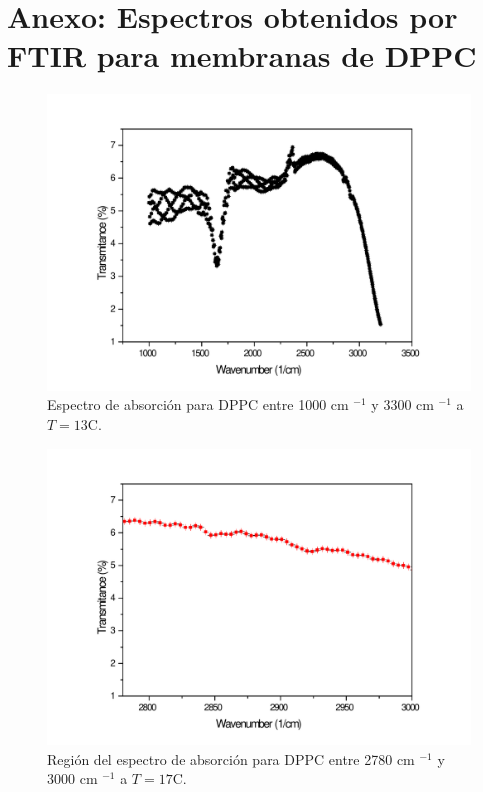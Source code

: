 \documentclass[%
 reprint,
 amsmath,amssymb,
 aps,
]{revtex4-1}
\begin{document}
\section*{Anexo: Espectros obtenidos por FTIR para membranas de DPPC}
\begin{figure}[ht]
\includegraphics[scale=0.2]{FTIR/Graph1.pdf}
  \caption{Espectro de absorción para DPPC entre 1000 cm $^{-1}$ y 3300 cm $^{-1}$ a $T=13$\textdegree C.}
  \label{fig:13}
\end{figure}
\begin{figure}[ht]
\includegraphics[scale=0.25]{FTIR/17C.pdf}
  \caption{Región del espectro de absorción para DPPC entre 2780 cm $^{-1}$ y 3000 cm $^{-1}$ a $T=17$\textdegree C.}
  \label{fig:espa17}
\end{figure}
\end{document}
